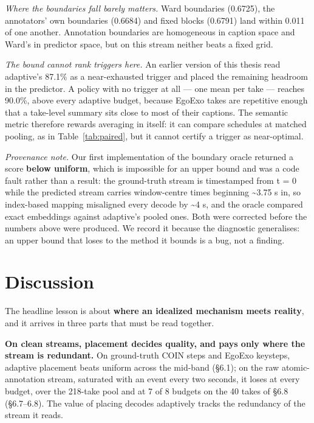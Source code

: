 \emph{Where the boundaries fall barely matters.} Ward boundaries (0.6725), the annotators' own boundaries (0.6684) and fixed blocks (0.6791) land within 0.011 of one another. Annotation boundaries are homogeneous in caption space and Ward's in predictor space, but on this stream neither beats a fixed grid.

\emph{The bound cannot rank triggers here.} An earlier version of this thesis read adaptive's 87.1\% as a near-exhausted trigger and placed the remaining headroom in the predictor. A policy with no trigger at all --- one mean per take --- reaches 90.0\%, above every adaptive budget, because EgoExo takes are repetitive enough that a take-level summary sits close to most of their captions. The semantic metric therefore rewards averaging in itself: it can compare schedules at matched pooling, as in Table~\ref{tab:paired}, but it cannot certify a trigger as near-optimal.

\emph{Provenance note.} Our first implementation of the boundary oracle returned a score \textbf{below uniform}, which is impossible for an upper bound and was a code fault rather than a result: the ground-truth stream is timestamped from t = 0 while the predicted stream carries window-centre times beginning \textasciitilde{}3.75 s in, so index-based mapping misaligned every decode by \textasciitilde{}4 s, and the oracle compared exact embeddings against adaptive's pooled ones. Both were corrected before the numbers above were produced. We record it because the diagnostic generalises: an upper bound that loses to the method it bounds is a bug, not a finding.

\section{Discussion}

The headline lesson is about \textbf{where an idealized mechanism meets reality}, and it arrives in three parts that must be read together.

\textbf{On clean streams, placement decides quality, and pays only where the stream is redundant.} On ground-truth COIN steps and EgoExo keysteps, adaptive placement beats uniform across the mid-band (\S6.1); on the raw atomic-annotation stream, saturated with an event every two seconds, it loses at every budget, over the 218-take pool and at 7 of 8 budgets on the 40 takes of \S6.8 (\S6.7--6.8). The value of placing decodes adaptively tracks the redundancy of the stream it reads.

